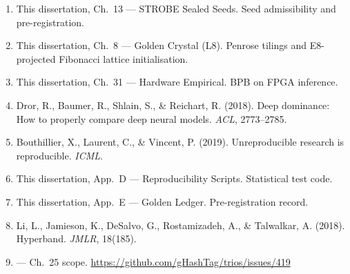 \begin{enumerate}
  \item This dissertation, Ch.~13 --- STROBE Sealed Seeds.
    Seed admissibility and pre-registration.

  \item This dissertation, Ch.~8 --- Golden Crystal (L8).
    Penrose tilings and E8-projected Fibonacci lattice initialisation.

  \item This dissertation, Ch.~31 --- Hardware Empirical.
    BPB on FPGA inference.

  \item Dror, R., Baumer, R., Shlain, S., \& Reichart, R. (2018).
    Deep dominance: How to properly compare deep neural models.
    \emph{ACL}, 2773--2785.

  \item Bouthillier, X., Laurent, C., \& Vincent, P. (2019).
    Unreproducible research is reproducible. \emph{ICML}.

  \item This dissertation, App.~D ---
    Reproducibility Scripts. Statistical test code.

  \item This dissertation, App.~E --- Golden Ledger.
    Pre-registration record.

  \item Li, L., Jamieson, K., DeSalvo, G., Rostamizadeh, A.,
    \& Talwalkar, A. (2018). Hyperband. \emph{JMLR}, 18(185).

  \item {} --- Ch.~25 scope.
    \url{https://github.com/gHashTag/trios/issues/419}
\end{enumerate}
